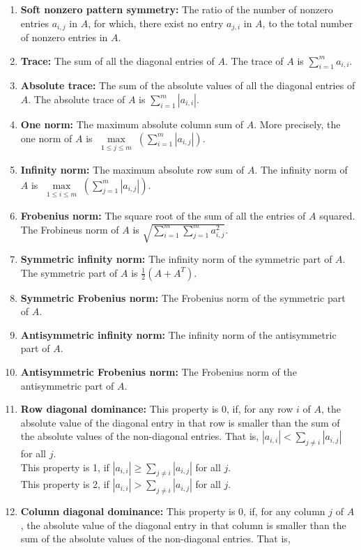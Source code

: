 \begin{enumerate}
\item \textbf{Soft nonzero pattern symmetry:} The ratio of the number of nonzero entries $a_{i,j}$ in $A$, for which, there exist no entry $a_{j,i}$ in $A$, to the total number of nonzero entries in $A$.
\item \textbf{Trace:} The sum of all the diagonal entries of $A$. The trace of $A$ is $\sum_{i=1}^{m} a_{i,i}$.
\item \textbf{Absolute trace:} The sum of the absolute values of all the diagonal entries of $A$. The absolute trace of $A$ is $\sum_{i=1}^{m} |a_{i,i}|$.
\item \textbf{One norm:} The maximum absolute column sum of $A$. More precisely, the one norm of $A$ is $\max\limits_{\substack{1 \leq j \leq m}}(\sum_{i=1}^{m} |a_{i,j}|)$.

\item \textbf{Infinity norm:} The maximum absolute row sum of $A$. The infinity norm of $A$ is $\max\limits_{\substack{1 \leq i \leq m}}(\sum_{j=1}^{m} |a_{i,j}|)$.
\item \textbf{Frobenius norm:} The square root of the sum of all the entries of $A$ squared. The Frobineus norm of $A$ is $\sqrt{\sum_{i=1}^{m}\sum_{j=1}^{m} a_{i,j}^2}$.
\item \textbf{Symmetric infinity norm:} The infinity norm of the symmetric part of $A$. The symmetric part of $A$ is $\frac{1}{2}(A + A^{T})$.
\item \textbf{Symmetric Frobenius norm:} The Frobenius norm of the symmetric part of $A$.
\item \textbf{Antisymmetric infinity norm:} The infinity norm of the antisymmetric part of $A$.
\item \textbf{Antisymmetric Frobenius norm:} The Frobenius norm of the antisymmetric part of $A$.
\item \textbf{Row diagonal dominance:}
This property is 0, if, for any row $i$ of $A$, the absolute value of the diagonal entry in that row is smaller than the sum of the absolute values of the non-diagonal entries. That is,
$|a_{i,i}| < \sum_{j \neq i} |a_{i,j}|$  for all $j$.\\
This property is 1, if $|a_{i,i}| \geq \sum_{j \neq i} |a_{i,j}|$  for all $j$.\\
This property is 2, if $|a_{i,i}| > \sum_{j \neq i} |a_{i,j}|$  for all $j$.
\item \textbf{Column diagonal dominance:}
This property is 0, if, for any column $j$ of $A$, the absolute value of the diagonal entry in that column is smaller than the sum of the absolute values of the non-diagonal entries. That is,

\end{enumerate}
